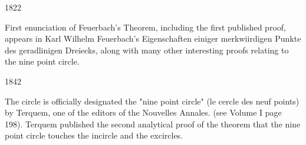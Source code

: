 \documentclass{greaseproof}
\begin{document}
1822

First enunciation of Feuerbach's Theorem, including the first published proof, appears in Karl Wilhelm Feuerbach's Eigenschaften einiger merkwiirdigen Punkte des geradlinigen Dreiecks, along with many other interesting proofs relating to the nine point circle.

1842

The circle is officially designated the "nine point circle" (le cercle des neuf points) by Terquem, one of the editors of the Nouvelles Annales. (see Volume I page 198). Terquem published the second analytical proof of the theorem that the nine point circle touches the incircle and the excircles.

{}


\raggedright
{}
\printindex

\printindex[persons]
\end{document}
